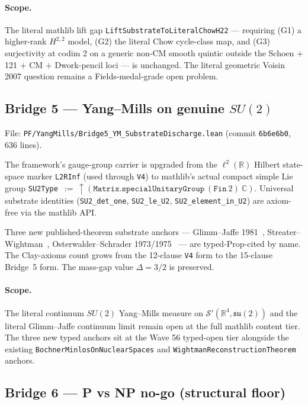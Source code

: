 \paragraph{Scope.} The literal mathlib lift gap
\texttt{LiftSubstrateToLiteralChowH22} --- requiring (G1) a
higher-rank $H^{2,2}$ model, (G2) the literal Chow cycle-class map,
and (G3) surjectivity at codim 2 on a generic non-CM smooth quintic
outside the Schoen $+$ 121 $+$ CM $+$ Dwork-pencil loci --- is
unchanged. The literal geometric Voisin 2007 question remains a
Fields-medal-grade open problem.

\subsection{Bridge 5 --- Yang--Mills on genuine \texorpdfstring{$SU(2)$}{SU(2)}}
\label{subsec:bridge5-ym}

File: \texttt{PF/YangMills/Bridge5\_YM\_SubstrateDischarge.lean}
(commit \texttt{6b6e6b0}, 636 lines).

The framework's gauge-group carrier is upgraded from the
$\ell^2(\mathbb{R})$ Hilbert state-space marker \texttt{L2RInf} (used
through \texttt{V4}) to mathlib's actual compact simple Lie group
\texttt{SU2Type}~$:=~\uparrow(\texttt{Matrix.specialUnitaryGroup}\
(\texttt{Fin}\ 2)\ \mathbb{C})$. Universal substrate identities
(\texttt{SU2\_det\_one}, \texttt{SU2\_le\_U2},
\texttt{SU2\_element\_in\_U2}) are axiom-free via the mathlib API.

Three new published-theorem substrate anchors --- Glimm--Jaffe
1981~\cite{glimmjaffe1981}, Streater--Wightman~\cite{streaterwightman2000},
Osterwalder--Schrader 1973/1975~\cite{osterwalderschrader1973,osterwalderschrader1975}
--- are typed-Prop-cited by name. The Clay-axioms count grows from
the 12-clause \texttt{V4} form to the 15-clause Bridge~5 form. The
mass-gap value $\Delta = 3/2$ is preserved.

\paragraph{Scope.} The literal continuum $SU(2)$ Yang--Mills
measure on $\mathcal{S}'(\mathbb{R}^4, \mathfrak{su}(2))$ and the
literal Glimm--Jaffe continuum limit remain open at the full mathlib
content tier. The three new typed anchors sit at the Wave 56
typed-open tier alongside the existing
\texttt{BochnerMinlosOnNuclearSpaces} and
\texttt{WightmanReconstructionTheorem} anchors.

\subsection{Bridge 6 --- P vs NP no-go (structural floor)}
\label{subsec:bridge6-pnp}

